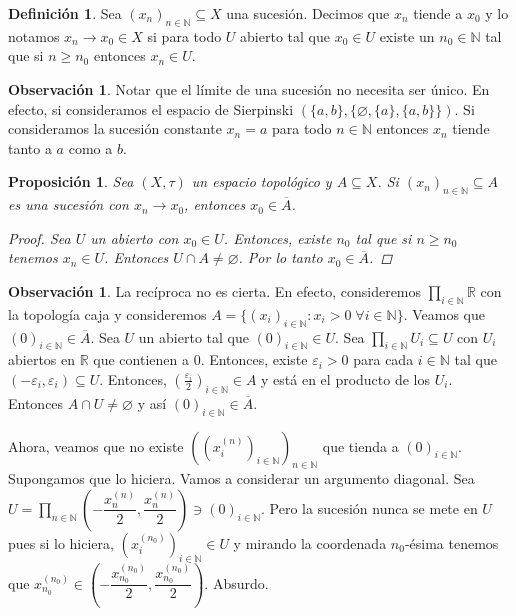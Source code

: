 \documentclass[12pt]{book}
\newtheorem{prop}[teo]{Proposición}
\theoremstyle{definition}
\newtheorem{obs}[teo]{Observación}
\newtheorem{defn}[teo]{Definición}
\newcommand{\RR}{\mathbb{R}}      %
\newcommand{\NN}{\mathbb{N}}
\let\emptyset\varnothing
\begin{document}
\begin{defn}
Sea $(x_n)_{n\in\NN}\subseteq X$ una sucesión. Decimos que $x_n$ tiende a $x_0$ y lo notamos $x_n\longrightarrow x_0\in X$ si para todo $U$ abierto tal que $x_0\in U$ existe un $n_0\in\NN$ tal que si $n\geq n_0$ entonces $x_n\in U$. 
\end{defn}

\begin{obs}
Notar que el límite de una sucesión no necesita ser único. En efecto, si consideramos el espacio de Sierpinski $(\{a,b\}, \{\emptyset,\{a\},\{a,b\}\})$. Si consideramos la sucesión constante $x_n=a$ para todo $n\in\NN$ entonces $x_n$ tiende tanto a $a$ como a $b$.
\end{obs}

\begin{prop}
Sea $(X,\tau)$ un espacio topológico y $A\subseteq X$. Si $(x_n)_{n\in\NN}\subseteq A$ es una sucesión con $x_n\longrightarrow x_0$, entonces $x_0\in\overline{A}$.
\begin{proof}
Sea $U$ un abierto con $x_0\in U$. Entonces, existe $n_0$ tal que si $n\geq n_0$ tenemos $x_n\in U$. Entonces $U\cap A\neq\emptyset$. Por lo tanto $x_0\in\overline{A}$.
\end{proof}
\end{prop}

\begin{obs}
La recíproca no es cierta. En efecto, consideremos $\displaystyle\prod_{i\in \NN}\RR$ con la topología caja y consideremos $A=\{(x_i)_{i\in\NN} : x_i>0 \;\forall i\in \NN\}$. Veamos que $(0)_{i\in\NN}\in\overline{A}$. Sea $U$ un abierto tal que $(0)_{i\in\NN}\in U$. Sea $\displaystyle\prod_{i\in\NN}U_i\subseteq U$ con $U_i$ abiertos en $\RR$ que contienen a $0$. Entonces, existe $\varepsilon_i>0$ para cada $i\in\NN$ tal que $(-\varepsilon_i,\varepsilon_i)\subseteq U$. Entonces, $(\frac{\varepsilon_i}{2})_{i\in\NN}\in A$ y está en el producto de los $U_i$. Entonces $A\cap U\neq \emptyset$ y así $(0)_{i\in\NN}\in\overline{A}$.

Ahora, veamos que no existe $((x_i^{(n)})_{i\in\NN})_{n\in\NN}$ que tienda a $(0)_{i\in\NN}$. Supongamos que lo hiciera. Vamos a considerar un argumento diagonal. Sea $U=\displaystyle\prod_{n\in\NN} \left(-\dfrac{x_n^{(n)}}{2},\dfrac{x_n^{(n)}}{2}\right)\ni (0)_{i\in\NN}$. Pero la sucesión nunca se mete en $U$ pues si lo hiciera, $(x_{i}^{(n_0)})_{i\in\NN}\in U$ y mirando la coordenada $n_0$-ésima tenemos que $x_{n_0}^{(n_0)}\in \left(-\dfrac{x_{n_0}^{(n_0)}}{2},\dfrac{x_{n_0}^{(n_0)}}{2}\right)$. Absurdo.
\end{obs}
\end{document}
